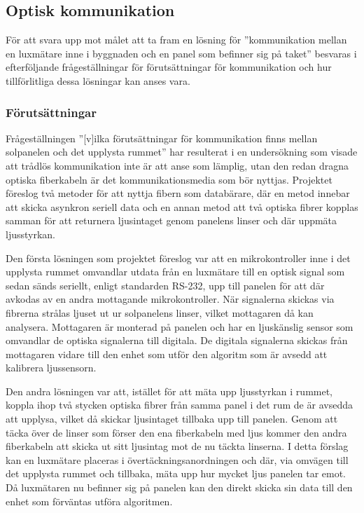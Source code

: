     \subsection{Optisk kommunikation} %
    \label{sub:optisk_kommunikation}
        För att svara upp mot målet att ta fram en lösning för ''kommunikation mellan en luxmätare inne i byggnaden och en panel som befinner sig på taket'' besvaras i efterföljande frågeställningar för förutsättningar för kommunikation och hur tillförlitliga dessa lösningar kan anses vara.

        \subsubsection{Förutsättningar} %
        \label{sub:forutsattningar}
                
            Frågeställningen ''[v]ilka förutsättningar för kommunikation finns mellan solpanelen och det upplysta rummet'' har resulterat i en undersökning som visade att trådlös kommunikation inte är att anse som lämplig, utan den redan dragna optiska fiberkabeln är det kommunikationsmedia som bör nyttjas. Projektet föreslog två metoder för att nyttja fibern som databärare, där en metod innebar att skicka asynkron seriell data och en annan metod att två optiska fibrer kopplas samman för att returnera ljusintaget genom panelens linser och där uppmäta ljusstyrkan.\bigskip

            Den första lösningen som projektet föreslog var att en mikrokontroller inne i det upplysta rummet omvandlar utdata från en luxmätare till en optisk signal som sedan sänds seriellt, enligt standarden RS-232, upp till panelen för att där avkodas av en andra mottagande mikrokontroller. När signalerna skickas via fibrerna strålas ljuset ut ur solpanelens linser, vilket mottagaren då kan analysera. Mottagaren är monterad på panelen och har en ljuskänslig sensor som omvandlar de optiska signalerna till digitala. De digitala signalerna skickas från mottagaren vidare till den enhet som utför den algoritm som är avsedd att kalibrera ljussensorn. \bigskip

            Den andra lösningen var att, istället för att mäta upp ljusstyrkan i rummet, koppla ihop två stycken optiska fibrer från samma panel i det rum de är avsedda att upplysa, vilket då skickar ljusintaget tillbaka upp till panelen. Genom att täcka över de linser som förser den ena fiberkabeln med ljus kommer den andra fiberkabeln att skicka ut sitt ljusintag mot de nu täckta linserna. I detta förslag kan en luxmätare placeras i övertäckningsanordningen och där, via omvägen till det upplysta rummet och tillbaka, mäta upp hur mycket ljus panelen tar emot. Då luxmätaren nu befinner sig på panelen kan den direkt skicka sin data till den enhet som förväntas utföra algoritmen.

